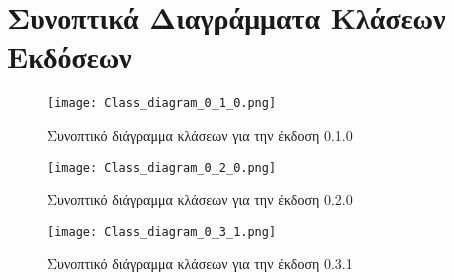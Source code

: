 \section{Συνοπτικά Διαγράμματα Κλάσεων Εκδόσεων}
	\label{ap:version_class_diag}
	\begin{figure}[h]
	\centering
		\texttt{[image: Class\_diagram\_0\_1\_0.png]}
	\caption{Συνοπτικό διάγραμμα κλάσεων για την έκδοση 0.1.0}
	\end{figure}

	\begin{figure}[p]
	\centering
		\texttt{[image: Class\_diagram\_0\_2\_0.png]}
	\caption{Συνοπτικό διάγραμμα κλάσεων για την έκδοση 0.2.0}
	\end{figure}

	\begin{figure}[p]
	\centering
		\texttt{[image: Class\_diagram\_0\_3\_1.png]}
	\caption{Συνοπτικό διάγραμμα κλάσεων για την έκδοση 0.3.1}
	\end{figure}